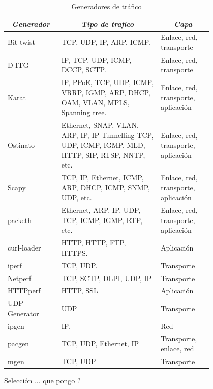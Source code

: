 \documentclass[12pt]{article}
\begin{document}
\begin{table}[htbp]
\footnotesize
\centering
\begin{tabular}{|p{0.2\linewidth}|p{0.4\linewidth}|p{0.2\linewidth}|}\hline
\multicolumn{1}{|c|}{\textit{\textbf{Generador}}} & 
\multicolumn{1}{|c|}{\textit{\textbf{Tipo de trafico}}} &
\multicolumn{1}{|c|}{\textit{\textbf{Capa}}}  \tabularnewline \hline

Bit-twist &
TCP, UDP, IP, ARP, ICMP. & 
Enlace, red, transporte  
\tabularnewline \hline

D-ITG &
IP, TCP, UDP, ICMP, DCCP, SCTP. & 
Enlace, red, transporte  
\tabularnewline \hline

Karat &
IP, PPoE, TCP, UDP, ICMP, VRRP, IGMP, ARP, DHCP, OAM, VLAN, MPLS, Spanning tree.
 & 
Enlace, red, transporte, aplicación  
\tabularnewline \hline

Ostinato &
Ethernet, SNAP, VLAN, ARP, IP, IP Tunnelling TCP, UDP, ICMP, IGMP, MLD, HTTP, SIP, RTSP, NNTP, etc. & 
Enlace, red, transporte, aplicación  
\tabularnewline \hline

Scapy &
TCP, IP, Ethernet, ICMP, ARP, DHCP, ICMP, SNMP, UDP, etc. & 
Enlace, red, transporte, aplicación  
\tabularnewline \hline

packeth &
Ethernet, ARP, IP, UDP, TCP, ICMP, IGMP, RTP, etc. & 
Enlace, red, transporte, aplicación  
\tabularnewline \hline

curl-loader &
HTTP, HTTP, FTP, HTTPS. & 
Aplicación  
\tabularnewline \hline

iperf &
TCP, UDP. & 
Transporte  
\tabularnewline \hline

Netperf &
TCP, SCTP, DLPI, UDP, IP  & 
Transporte  
\tabularnewline \hline

HTTPperf &
HTTP, SSL & 
Aplicación  
\tabularnewline \hline

UDP Generator &
UDP & 
Transporte  
\tabularnewline \hline

ipgen &
IP. & 
Red 
\tabularnewline \hline

pacgen &
TCP, UDP, Ethernet, IP & 
Transporte, enlace, red  
\tabularnewline \hline


mgen &
TCP, UDP & 
Transporte 
\tabularnewline \hline

\end{tabular}
\caption{Generadores de tráfico} \label{tab:sometab}
\end{table} 

Selección ... que pongo ? 
\end{document}
